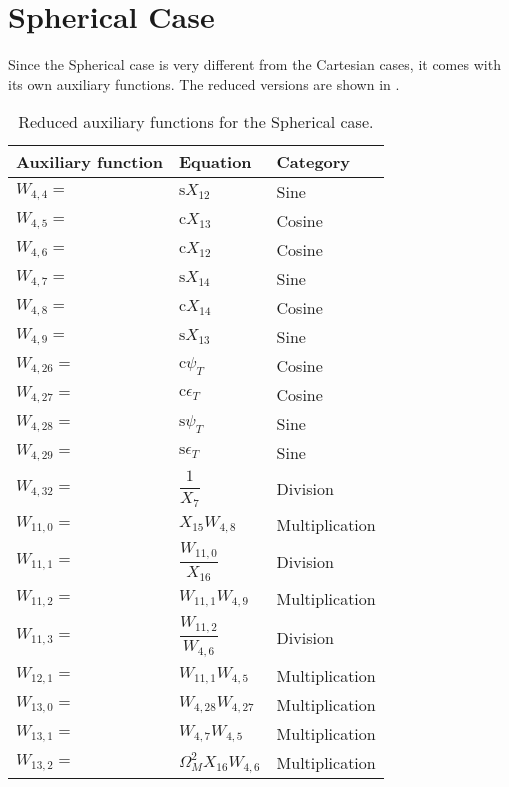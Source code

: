 \section{Spherical Case}
\label{sec:spherApp}
Since the Spherical case is very different from the Cartesian cases, it comes with its own auxiliary functions. The reduced versions are shown in .

{\small
\begin{longtable}{|p{1.5cm}|l|p{2cm}|}
\caption{Reduced auxiliary functions for the Spherical case.}
\label{tab:auxFunc3}
\endfirsthead
\endhead
\hline
\textbf{Auxiliary function} & \textbf{Equation} & \textbf{Category}  \\ \hline \hline
\hline 
$W_{4,4}=$ & $ \text{s} X_{12} $ & Sine \\ \hline 
$W_{4,5}=$ & $ \text{c} X_{13} $ & Cosine \\ \hline 
$W_{4,6}=$ & $ \text{c} X_{12} $ & Cosine \\ \hline 
$W_{4,7}=$ & $ \text{s} X_{14} $ & Sine \\ \hline 
$W_{4,8}=$ & $ \text{c} X_{14} $ & Cosine \\ \hline 
$W_{4,9}=$ & $ \text{s} X_{13} $ & Sine \\ \hline 
$W_{4,26}=$ & $ \text{c} \psi_{T} $ & Cosine \\ \hline 
$W_{4,27}=$ & $ \text{c} \epsilon_{T} $ & Cosine \\ \hline 
$W_{4,28}=$ & $ \text{s} \psi_{T} $ & Sine \\ \hline 
$W_{4,29}=$ & $ \text{s} \epsilon_{T} $ & Sine \\ \hline 
$W_{4,32}=$ & $ \dfrac{1}{X_{7}} $ & Division \\ \hline 
$W_{11,0}=$ & $ X_{15}W_{4,8} $ & Multiplication \\ \hline
$W_{11,1}=$ & $ \dfrac{W_{11,0}}{X_{16}} $ & Division \\ \hline
$W_{11,2}=$ & $ W_{11,1}W_{4,9} $ & Multiplication \\ \hline
$W_{11,3}=$ & $ \dfrac{W_{11,2}}{W_{4,6}} $ & Division \\ \hline
$W_{12,1}=$ & $ W_{11,1}W_{4,5} $ & Multiplication \\ \hline
$W_{13,0}=$ & $ W_{4,28}W_{4,27} $ & Multiplication \\ \hline
$W_{13,1}=$ & $ W_{4,7}W_{4,5} $ & Multiplication \\ \hline
$W_{13,2}=$ & $ \Omega_{M}^{2} X_{16} W_{4,6} $ & Multiplication \\ \hline

\end{longtable}}
